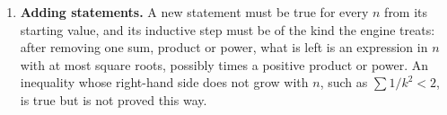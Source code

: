 \documentclass[11pt,a4paper]{article}
\begin{document}
\begin{enumerate}
\item \textbf{Adding statements.} A new statement must be true for every $n$ from its starting value, and its inductive step must be of the kind the engine treats: after removing one sum, product or power, what is left is an expression in $n$ with at most square roots, possibly times a positive product or power. An inequality whose right-hand side does not grow with $n$, such as $\sum 1/k^{2} < 2$, is true but is not proved this way.
\end{enumerate}
\end{document}
